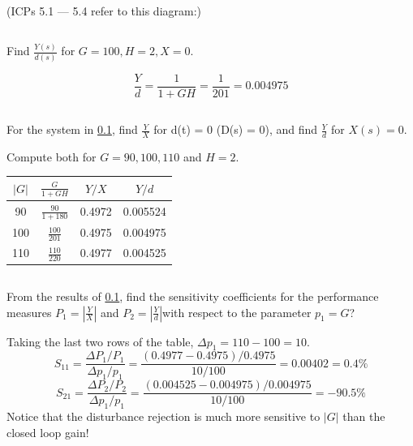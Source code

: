\documentclass{article}	%
\begin{document}
(ICPs 5.1 --- 5.4 refer to this diagram:)

\subsection{}\label{disturbancerej1}

Find $\frac{Y(s)}{d(s)}$ for $G=100, H=2, X = 0$. \\[0.15in]

\begin{solution}
\[
\frac{Y}{d} = \frac{1}{1+GH} = \frac{1}{201} = 0.004975
\]
\end{solution}


\subsection{}
For the system in \ref{disturbancerej1}, find
$\frac{Y}{X}$ for d(t) = 0 (D(s) = 0), and find
$\frac{Y}{d}$ for $X(s) = 0$.

Compute both for $G = 90, 100, 110$ and $H=2$.\\[0.15in]


\begin{solution}
\begin{tabular}{c|c|c|c}
$|G|$   		&  $\frac{G}{1+GH}$      &  $Y/X$   	&  $Y/d$\\ \hline
90		&  $\frac{90}{1+180}$    &  0.4972      &  0.005524  \\
100             &  $\frac{100}{201}$	 &  0.4975	&  0.004975 \\
110             &  $\frac{110}{220}$	 &  0.4977      &  0.004525
\end{tabular}
\end{solution}







\subsection{}
 From the results of \ref{disturbancerej1}, find the sensitivity coefficients for the performance measures $P_1=|\frac{Y}{X}|$ and $P_2=|\frac{Y}{d}|$with respect to the parameter $p_1 = G$?\\[0.15in]

\begin{solution}


Taking the last two rows of the table, $\Delta p_1 = 110-100 = 10$.
\[
S_{11} = \frac{\Delta P_1/P_1}{\Delta p_1/p_1} = \frac{(0.4977-0.4975)/0.4975}{10/100} = 0.00402 = 0.4\%
\]
\[
S_{21} = \frac{\Delta P_2/P_2}{\Delta p_1/p_1} = \frac{(0.004525-0.004975)/0.004975}{10/100} = -90.5\%
\]
Notice that the disturbance rejection is much more sensitive to $|G|$ than the closed loop gain!

\end{solution}
\end{document}
